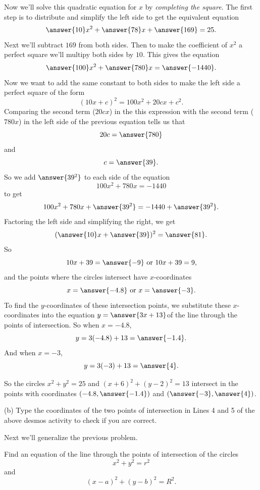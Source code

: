 \documentclass{ximera}
\begin{document}
\begin{explanation}
\begin{question}
Now we'll solve this quadratic equation for $x$ by \emph{completing the square}. The first step is to distribute and simplify the left side to get the equivalent equation
\[
    \answer{10}x^2 + \answer{78}x + \answer{169} = 25.
\]
Next we'll subtract $169$ from both sides. Then to make the coefficient of $x^2$ a perfect square we'll multipy both sides by $10$. This gives the equation
\[
      \answer{100}x^2 + \answer{780}x = \answer{-1440} .
\]
Now we want to add the same constant to both sides to make the left side a perfect square of the form
\[
      (10x + c)^2 = 100x^2 + 20cx + c^2 .
\]
Comparing the second term ($20cx$) in the this expression with the second term ($780x$) in the left side of the previous equation  tells us that 
\[
     20c = \answer{780} 
\]
and
\[
    c = \answer{39} .
\]
So we add $\answer{39^2}$ to each side of the equation
\[
   100x^2 + 780x = -1440
\]
to get
\[
  100x^2 + 780x + \answer{39^2} = -1440 + \answer{39^2} .
\]
Factoring the left side and simplifying the right, we get
\[
        (\answer{10}x + \answer{39})^2 = \answer{81} .
\]
So
\[
        10x + 39 = \answer{-9}  \text{ or } 10x+39 = 9 ,
\]
and the points where the circles intersect have $x$-coordinates
\[
      x = \answer{-4.8} \text{ or } x = \answer{-3} .
\]
To find the $y$-coordinates of these intersection points, we substitute these $x$-coordinates into the equation $y=\answer{3x+13}$of the line through the points of intersection. So when $x=-4.8$, 
\[
   y = 3(-4.8)+13 = \answer{-1.4} . 
\]
And when $x=-3$,
\[
   y = 3(-3)+13 = \answer{4} . 
\]

So the circles $x^2 + y^2 = 25$ and $(x+6)^2+(y-2)^2=13$ intersect in the points with coordinates $(-4.8,\answer{-1.4})$ and $(\answer{-3}, \answer{4})$.

(b) Type the coordinates of the two points of intersection in Lines 4 and 5 of the above desmos activity to check if you are correct. 
\end{question}

\end{explanation}

Next we'll generalize the previous problem.

\begin{example} \label{Ex4c}
Find an equation of the line through the points of intersection of the circles
\[
    x^2 + y^2 = r^2
\]
and 
\[
   (x-a)^2 + (y-b)^2=R^2.
\]
\end{example}
\end{document}
